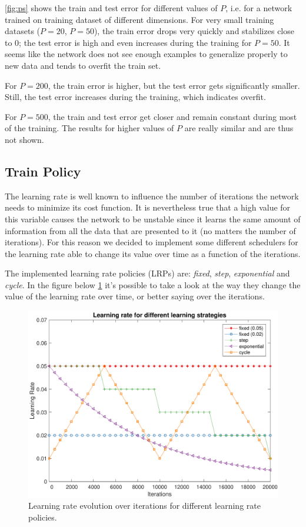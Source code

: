 \cref{fig:ps} shows the train and test error for different values of $P$, i.e. for a network trained on training dataset of different dimensions.
For very small training datasets ($P = 20$, $P = 50$), the train error drops very quickly and stabilizes close to $0$;
the test error is high and even increases during the training for $P = 50$.
It seems like the network does not see enough examples to generalize properly to new data and tends to overfit the train set.

For $P = 200$, the train error is higher, but the test error gets significantly smaller.
Still, the test error increases during the training, which indicates overfit.

For $P = 500$, the train and test error get closer and remain constant during most of the training.
The results for higher values of $P$ are really similar and are thus not shown.

\subsection{Train Policy}
The learning rate is well known to influence the number of iterations the network needs to minimize
its cost function. It is nevertheless true that a high value for this variable causes the network to
be unstable since it learns the same amount of information from all the data that are presented to it (no matters the number of iterations).
For this reason we decided to implement some different schedulers for the learning rate able to change its
value over time as a function of the iterations.

The implemented learning rate policies (LRPs) are: \textit{fixed}, \textit{step}, \textit{exponential} and \textit{cycle}.
In the figure below \cref{fig:learning_rates_policies} it's possible to take a look at the way they change the value of the learning rate over time,
or better saying over the iterations.

\begin{figure}
	\centering
	\includegraphics[width=\columnwidth]{figures/learning_rates}
	\caption{Learning rate evolution over iterations for different learning rate policies.}
	\label{fig:learning_rates_policies}
\end{figure}

